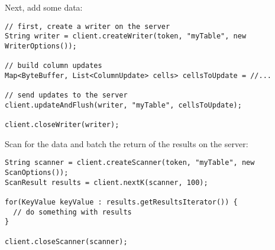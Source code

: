 Next, add some data:

\begingroup\fontsize{8pt}{8pt}\selectfont\begin{verbatim}
// first, create a writer on the server
String writer = client.createWriter(token, "myTable", new WriterOptions());

// build column updates
Map<ByteBuffer, List<ColumnUpdate> cells> cellsToUpdate = //...

// send updates to the server
client.updateAndFlush(writer, "myTable", cellsToUpdate);

client.closeWriter(writer);
\end{verbatim}\endgroup


Scan for the data and batch the return of the results on the server:

\begingroup\fontsize{8pt}{8pt}\selectfont\begin{verbatim}
String scanner = client.createScanner(token, "myTable", new ScanOptions());
ScanResult results = client.nextK(scanner, 100);

for(KeyValue keyValue : results.getResultsIterator()) {
  // do something with results
}

client.closeScanner(scanner);
\end{verbatim}\endgroup
